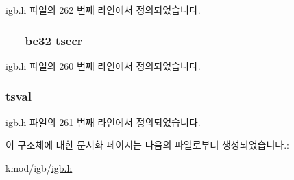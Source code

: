 igb.\+h 파일의 262 번째 라인에서 정의되었습니다.

\subsubsection[{\texorpdfstring{tsecr}{tsecr}}]{\setlength{\rightskip}{0pt plus 5cm}\+\_\+\+\_\+be32 tsecr}\hypertarget{structigb__cb_aface93a372a36f1a47ba2ee21ad56f92}{}\label{structigb__cb_aface93a372a36f1a47ba2ee21ad56f92}


igb.\+h 파일의 260 번째 라인에서 정의되었습니다.

\subsubsection[{\texorpdfstring{tsval}{tsval}}]{ tsval}\hypertarget{structigb__cb_a2c84d9464c4cf8456af401e0fd86d8f8}{}\label{structigb__cb_a2c84d9464c4cf8456af401e0fd86d8f8}


igb.\+h 파일의 261 번째 라인에서 정의되었습니다.



이 구조체에 대한 문서화 페이지는 다음의 파일로부터 생성되었습니다.\+:\begin{DoxyCompactItemize}
\item 
kmod/igb/\hyperlink{kmod_2igb_2igb_8h}{igb.\+h}\end{DoxyCompactItemize}
